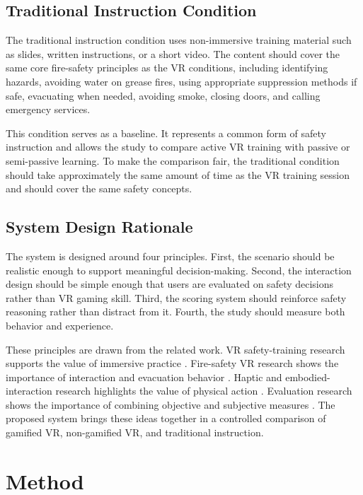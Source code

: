 \documentclass[manuscript, review]{acmart}
\begin{document}
{\subsection{Traditional Instruction Condition}

The traditional instruction condition uses non-immersive training material such as slides, written instructions, or a short video. The content should cover the same core fire-safety principles as the VR conditions, including identifying hazards, avoiding water on grease fires, using appropriate suppression methods if safe, evacuating when needed, avoiding smoke, closing doors, and calling emergency services.

This condition serves as a baseline. It represents a common form of safety instruction and allows the study to compare active VR training with passive or semi-passive learning. To make the comparison fair, the traditional condition should take approximately the same amount of time as the VR training session and should cover the same safety concepts.

\subsection{System Design Rationale}

The system is designed around four principles. First, the scenario should be realistic enough to support meaningful decision-making. Second, the interaction design should be simple enough that users are evaluated on safety decisions rather than VR gaming skill. Third, the scoring system should reinforce safety reasoning rather than distract from it. Fourth, the study should measure both behavior and experience.

These principles are drawn from the related work. VR safety-training research supports the value of immersive practice \cite{kanade2022use,scorgie2024virtual}. Fire-safety VR research shows the importance of interaction and evacuation behavior \cite{kang2022combining,somerkoski2020digital}. Haptic and embodied-interaction research highlights the value of physical action \cite{seo2019interactive}. Evaluation research shows the importance of combining objective and subjective measures \cite{bikkina2025learnings}. The proposed system brings these ideas together in a controlled comparison of gamified VR, non-gamified VR, and traditional instruction.

\section{Method}
\label{sec:method}

}
\end{document}
